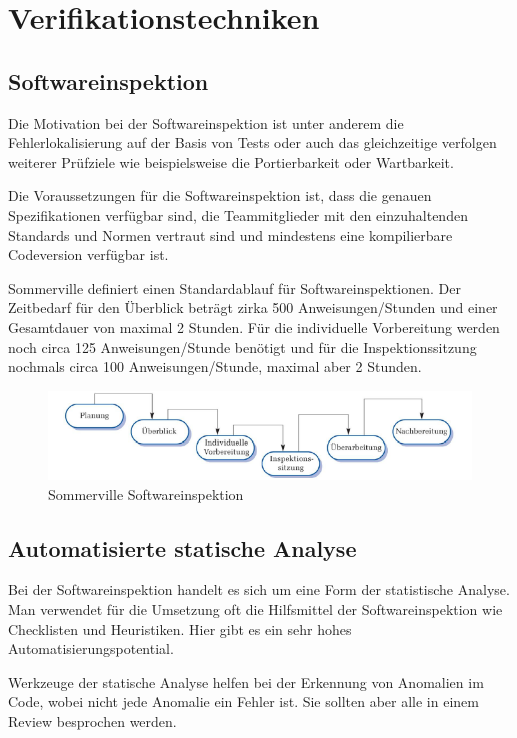 \chapter{Verifikationstechniken}
\section{Softwareinspektion}
Die Motivation bei der Softwareinspektion ist unter anderem die Fehlerlokalisierung auf der Basis von Tests oder auch das gleichzeitige verfolgen weiterer Prüfziele wie beispielsweise die Portierbarkeit oder Wartbarkeit. 

Die Voraussetzungen für die Softwareinspektion ist, dass die genauen Spezifikationen verfügbar sind, die Teammitglieder mit den einzuhaltenden Standards und Normen vertraut sind und mindestens eine kompilierbare Codeversion verfügbar ist. 

Sommerville definiert einen Standardablauf für Softwareinspektionen. Der Zeitbedarf für den Überblick beträgt zirka 500 Anweisungen/Stunden und einer Gesamtdauer von maximal 2 Stunden. Für die individuelle Vorbereitung werden noch circa 125 Anweisungen/Stunde benötigt und für die Inspektionssitzung nochmals circa 100 Anweisungen/Stunde, maximal aber 2 Stunden.

\begin{figure}[hbtp]
\centering
\includegraphics[scale=0.8]{document/graphics/SwInspektion} 
\caption{Sommerville Softwareinspektion}
\end{figure}


\section{Automatisierte statische Analyse}
Bei der Softwareinspektion handelt es sich um eine Form der statistische Analyse. Man verwendet für die Umsetzung oft die Hilfsmittel der Softwareinspektion wie Checklisten und Heuristiken. Hier gibt es ein sehr hohes Automatisierungspotential. 

Werkzeuge der statische Analyse helfen bei der Erkennung von Anomalien im Code, wobei nicht jede Anomalie ein Fehler ist. Sie sollten aber alle in einem Review besprochen werden.

